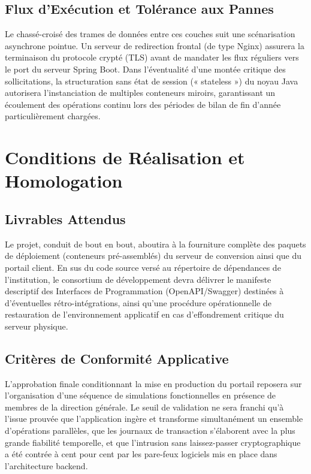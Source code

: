 \documentclass[12pt,a4paper,twoside]{report}
\begin{document}
\section{Flux d'Exécution et Tolérance aux Pannes}
Le chassé-croisé des trames de données entre ces couches suit une scénarisation asynchrone pointue. Un serveur de redirection frontal (de type Nginx) assurera la terminaison du protocole crypté (TLS) avant de mandater les flux réguliers vers le port du serveur Spring Boot. Dans l'éventualité d'une montée critique des sollicitations, la structuration sans état de session (« stateless ») du noyau Java autorisera l'instanciation de multiples conteneurs miroirs, garantissant un écoulement des opérations continu lors des périodes de bilan de fin d'année particulièrement chargées.


\chapter{Conditions de Réalisation et Homologation}

\section{Livrables Attendus}
Le projet, conduit de bout en bout, aboutira à la fourniture complète des paquets de déploiement (conteneurs pré-assemblés) du serveur de conversion ainsi que du portail client. En sus du code source versé au répertoire de dépendances de l'institution, le consortium de développement devra délivrer le manifeste descriptif des Interfaces de Programmation (OpenAPI/Swagger) destinées à d'éventuelles rétro-intégrations, ainsi qu'une procédure opérationnelle de restauration de l'environnement applicatif en cas d'effondrement critique du serveur physique.

\section{Critères de Conformité Applicative}
L'approbation finale conditionnant la mise en production du portail reposera sur l'organisation d'une séquence de simulations fonctionnelles en présence de membres de la direction générale. Le seuil de validation ne sera franchi qu'à l'issue prouvée que l'application ingère et transforme simultanément un ensemble d'opérations parallèles, que les journaux de transaction s'élaborent avec la plus grande fiabilité temporelle, et que l'intrusion sans laissez-passer cryptographique a été contrée à cent pour cent par les pare-feux logiciels mis en place dans l'architecture backend.
\end{document}
